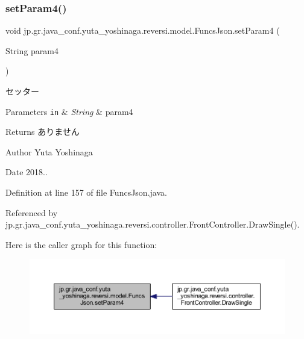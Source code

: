 \subsubsection{\texorpdfstring{set\+Param4()}{setParam4()}}
{\footnotesize\ttfamily void jp.\+gr.\+java\+\_\+conf.\+yuta\+\_\+yoshinaga.\+reversi.\+model.\+Funcs\+Json.\+set\+Param4 (\begin{DoxyParamCaption}\item[{String}]{param4 }\end{DoxyParamCaption})}



セッター 


\begin{DoxyParams}[1]{Parameters}
\mbox{\tt in}  & {\em String} & param4 \\
\hline
\end{DoxyParams}
\begin{DoxyReturn}{Returns}
ありません 
\end{DoxyReturn}
\begin{DoxyAuthor}{Author}
Yuta Yoshinaga 
\end{DoxyAuthor}
\begin{DoxyDate}{Date}
2018.. 
\end{DoxyDate}


Definition at line 157 of file Funcs\+Json.\+java.



Referenced by jp.\+gr.\+java\+\_\+conf.\+yuta\+\_\+yoshinaga.\+reversi.\+controller.\+Front\+Controller.\+Draw\+Single().

Here is the caller graph for this function\+:
\nopagebreak
\begin{figure}[H]
\begin{center}
\leavevmode
\includegraphics[width=350pt]{classjp_1_1gr_1_1java__conf_1_1yuta__yoshinaga_1_1reversi_1_1model_1_1_funcs_json_a44af51970635551127a296e3c07db7ec_icgraph}
\end{center}
\end{figure}
\mbox{\label{classjp_1_1gr_1_1java__conf_1_1yuta__yoshinaga_1_1reversi_1_1model_1_1_funcs_json_a020f9dc27e5d795a0554ee1fda117797}} 
